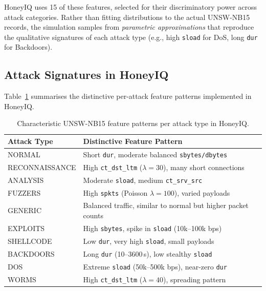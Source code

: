 HoneyIQ uses 15 of these features, selected for their discriminatory power
across attack categories.
Rather than fitting distributions to the actual UNSW-NB15 records, the
simulation samples from \emph{parametric approximations} that reproduce the
qualitative signatures of each attack type (e.g., high \texttt{sload} for
DoS, long \texttt{dur} for Backdoors).

\subsection{Attack Signatures in HoneyIQ}

Table~\ref{tab:feature_signatures} summarises the distinctive per-attack
feature patterns implemented in HoneyIQ.

\begin{table}[ht]
  \centering
  \caption{Characteristic UNSW-NB15 feature patterns per attack type in HoneyIQ.}
  \label{tab:feature_signatures}
  \begin{tabular}{lll}
    \toprule
    Attack Type & Distinctive Feature Pattern \\
    \midrule
    NORMAL         & Short \texttt{dur}, moderate balanced \texttt{sbytes/dbytes} \\
    RECONNAISSANCE & High \texttt{ct\_dst\_ltm} ($\lambda=30$), many short connections \\
    ANALYSIS       & Moderate \texttt{sload}, medium \texttt{ct\_srv\_src} \\
    FUZZERS        & High \texttt{spkts} (Poisson $\lambda=100$), varied payloads \\
    GENERIC        & Balanced traffic, similar to normal but higher packet counts \\
    EXPLOITS       & High \texttt{sbytes}, spike in \texttt{sload} (10k--100k bps) \\
    SHELLCODE      & Low \texttt{dur}, very high \texttt{sload}, small payloads \\
    BACKDOORS      & Long \texttt{dur} (10--3600\,s), low stealthy \texttt{sload} \\
    DOS            & Extreme \texttt{sload} (50k--500k bps), near-zero \texttt{dur} \\
    WORMS          & High \texttt{ct\_dst\_ltm} ($\lambda=40$), spreading pattern \\
    \bottomrule
  \end{tabular}
\end{table}

